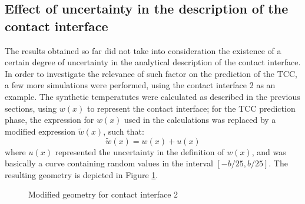 \documentclass[12pt]{CHT-20}
\begin{document}
\subsection*{Effect of uncertainty in the description of the contact interface} The results obtained so far did not take into consideration the existence of a certain degree of uncertainty in the analytical description of the contact interface. In order to investigate the relevance of such factor on the prediction of the TCC, a few more simulations were performed, using the contact interface 2 as an example. The synthetic temperatutes were calculated as described in the previous sections, using $w(x)$ to represent the contact interface; for the TCC prediction phase, the expression for $w(x)$ used in the calculations was replaced by a modified expression $\tilde{w}(x)$, such that:
\begin{equation}
\tilde{w}(x) = w(x) + u(x)
\end{equation}
where $u(x)$ represented the uncertainty in the definition of $w(x)$, and was basically a curve containing random values in the interval $[-b/25, b/25]$. The resulting geometry is depicted in Figure \ref{fig3b_mod}.
\begin{figure}[H]
	\begin{center}
		\caption{Modified geometry for contact interface 2}
		\label{fig3b_mod}
	\end{center}
\end{figure}
\end{document}
